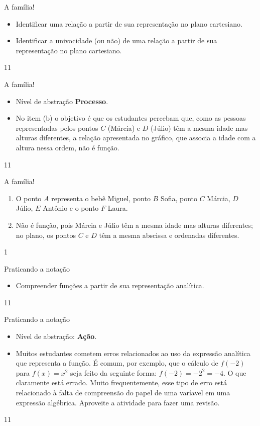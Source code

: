 \begin{objectives}{A família!}
{
\begin{itemize}

\item Identificar uma relação a partir de sua representação no plano cartesiano.

\item Identificar a univocidade (ou não) de uma relação a partir de sua representação no plano cartesiano.

\end{itemize}

}{1}{1}
\end{objectives}
\begin{sugestions}{A família!}
{
\begin{itemize}
\item Nível de abstração \textbf{Processo}.

\item No item (b) o objetivo é que os estudantes percebam que, como as pessoas representadas pelos pontos $C$ (Márcia) e $D$ (Júlio) têm a mesma idade mas alturas diferentes, a relação apresentada no gráfico, que associa a idade com a altura nessa ordem, não é função.
\end{itemize}
}{1}{1}
\end{sugestions}
\begin{answer}{A família!}
{
\begin{enumerate}
\item O ponto $A$ representa o bebê Miguel, ponto $B$ Sofia, ponto $C$ Márcia, $D$ Júlio, $E$ Antônio e o ponto $F$ Laura.

\item Não é função, pois Márcia e Júlio têm a mesma idade mas alturas diferentes; no plano, os pontos $C$ e $D$ têm a mesma abscissa e ordenadas diferentes.

\end{enumerate}
}{1}
\end{answer}
\clearmargin
\begin{objectives}{Praticando a notação}
{
\begin{itemize}

\item Compreender funções a partir de sua representação analítica.


\end{itemize}
}{1}{1}
\end{objectives}
\begin{sugestions}{Praticando a notação}
{
\begin{itemize}
\item Nível de abstração: \textbf{Ação}.

\item Muitos estudantes cometem erros relacionados ao uso da expressão analítica que representa a função. É comum, por exemplo, que o cálculo de $f(-2)$ para $f(x)=x^2$ seja feito da seguinte forma: $f(-2)=-2^2=-4$. O que claramente está errado. Muito frequentemente, esse tipo de erro está relacionado à falta de compreensão do papel de uma varíavel em uma expressão algébrica. Aproveite a atividade para fazer uma revisão.
\end{itemize}
}{1}{1}
\end{sugestions}
